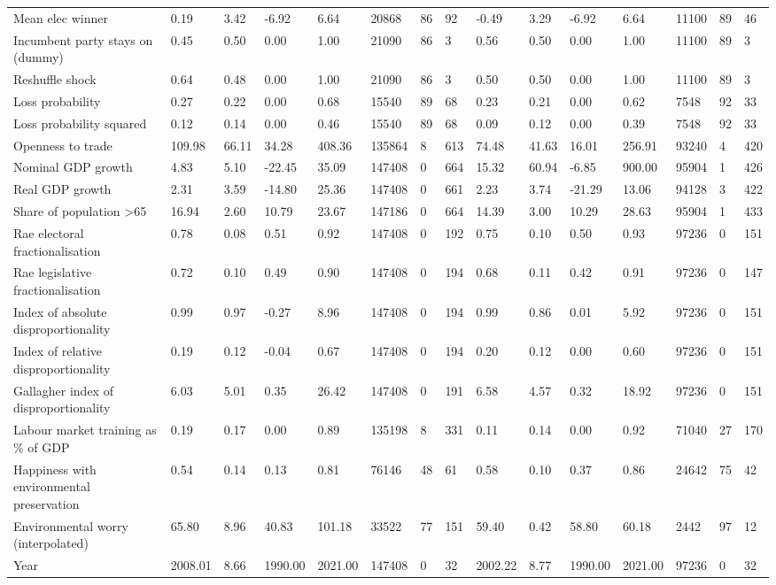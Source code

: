 \begin{longtable}{lllllllllllllll}
Mean elec winner & 0.19 & 3.42 & -6.92 & 6.64 & 20868 & 86 & 92 & -0.49 & 3.29 & -6.92 & 6.64 & 11100 & 89 & 46\\
Incumbent party stays on (dummy) & 0.45 & 0.50 & 0.00 & 1.00 & 21090 & 86 & 3 & 0.56 & 0.50 & 0.00 & 1.00 & 11100 & 89 & 3\\
Reshuffle shock & 0.64 & 0.48 & 0.00 & 1.00 & 21090 & 86 & 3 & 0.50 & 0.50 & 0.00 & 1.00 & 11100 & 89 & 3\\
Loss probability & 0.27 & 0.22 & 0.00 & 0.68 & 15540 & 89 & 68 & 0.23 & 0.21 & 0.00 & 0.62 & 7548 & 92 & 33\\
\addlinespace
Loss probability squared & 0.12 & 0.14 & 0.00 & 0.46 & 15540 & 89 & 68 & 0.09 & 0.12 & 0.00 & 0.39 & 7548 & 92 & 33\\
Openness to trade & 109.98 & 66.11 & 34.28 & 408.36 & 135864 & 8 & 613 & 74.48 & 41.63 & 16.01 & 256.91 & 93240 & 4 & 420\\
Nominal GDP growth & 4.83 & 5.10 & -22.45 & 35.09 & 147408 & 0 & 664 & 15.32 & 60.94 & -6.85 & 900.00 & 95904 & 1 & 426\\
Real GDP growth & 2.31 & 3.59 & -14.80 & 25.36 & 147408 & 0 & 661 & 2.23 & 3.74 & -21.29 & 13.06 & 94128 & 3 & 422\\
Share of population >65 & 16.94 & 2.60 & 10.79 & 23.67 & 147186 & 0 & 664 & 14.39 & 3.00 & 10.29 & 28.63 & 95904 & 1 & 433\\
\addlinespace
Rae electoral fractionalisation & 0.78 & 0.08 & 0.51 & 0.92 & 147408 & 0 & 192 & 0.75 & 0.10 & 0.50 & 0.93 & 97236 & 0 & 151\\
Rae legislative fractionalisation & 0.72 & 0.10 & 0.49 & 0.90 & 147408 & 0 & 194 & 0.68 & 0.11 & 0.42 & 0.91 & 97236 & 0 & 147\\
Index of absolute disproportionality & 0.99 & 0.97 & -0.27 & 8.96 & 147408 & 0 & 194 & 0.99 & 0.86 & 0.01 & 5.92 & 97236 & 0 & 151\\
Index of relative disproportionality & 0.19 & 0.12 & -0.04 & 0.67 & 147408 & 0 & 194 & 0.20 & 0.12 & 0.00 & 0.60 & 97236 & 0 & 151\\
Gallagher index of disproportionality & 6.03 & 5.01 & 0.35 & 26.42 & 147408 & 0 & 191 & 6.58 & 4.57 & 0.32 & 18.92 & 97236 & 0 & 151\\
\addlinespace
Labour market training as \% of GDP & 0.19 & 0.17 & 0.00 & 0.89 & 135198 & 8 & 331 & 0.11 & 0.14 & 0.00 & 0.92 & 71040 & 27 & 170\\
Happiness with environmental preservation & 0.54 & 0.14 & 0.13 & 0.81 & 76146 & 48 & 61 & 0.58 & 0.10 & 0.37 & 0.86 & 24642 & 75 & 42\\
Environmental worry (interpolated) & 65.80 & 8.96 & 40.83 & 101.18 & 33522 & 77 & 151 & 59.40 & 0.42 & 58.80 & 60.18 & 2442 & 97 & 12\\
Year & 2008.01 & 8.66 & 1990.00 & 2021.00 & 147408 & 0 & 32 & 2002.22 & 8.77 & 1990.00 & 2021.00 & 97236 & 0 & 32\\
\bottomrule
\end{longtable}
